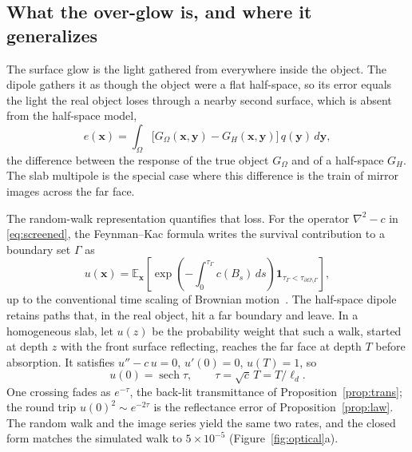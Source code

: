 \documentclass[11pt]{article}
\providecommand{\ROptSech}{0}
\renewcommand{\ROptSech}{5\times10^{-5}}
\newcommand{\ld}{\ell_d}
\newcommand{\E}{\mathbb{E}}
\begin{document}
\subsection{What the over-glow is, and where it generalizes}
\label{sec:optical}

The surface glow is the light gathered from everywhere inside the object. The
dipole gathers it as though the object were a flat half-space, so its error equals
the light the real object loses through a nearby second surface, which is absent from the
half-space model,
\begin{equation}
e(\mathbf{x})=\int_\Omega\big[G_\Omega(\mathbf{x},\mathbf{y})-G_H(\mathbf{x},\mathbf{y})\big]
\,q(\mathbf{y})\,d\mathbf{y},
\label{eq:greendiff}
\end{equation}
the difference between the response of the true object $G_\Omega$ and of a
half-space $G_H$. The slab multipole is the special case where this difference is
the train of mirror images across the far face.

The random-walk representation quantifies that loss. For the
operator $\nabla^2-c$ in \eqref{eq:screened}, the Feynman--Kac formula writes the
survival contribution to a boundary set $\Gamma$ as
\begin{equation}
u(\mathbf{x})=
\E_{\mathbf{x}}\!\left[
\exp\!\left(-\int_0^{\tau_\Gamma} c(B_s)\,ds\right)
\mathbf{1}_{\tau_\Gamma<\tau_{\partial\Omega\setminus\Gamma}}
\right],
\label{eq:fk}
\end{equation}
up to the conventional time scaling of Brownian motion~\cite{oksendal2003}. The
half-space dipole retains paths that, in the real object, hit a far boundary and
leave. In a homogeneous slab, let $u(z)$ be the probability weight that such a
walk, started at depth $z$ with the front surface reflecting, reaches the far face
at depth $T$ before absorption. It satisfies $u''-c\,u=0$, $u'(0)=0$, $u(T)=1$,
so
\begin{equation}
u(0)=\operatorname{sech}\tau,\qquad \tau=\sqrt{c}\,T=T/\ld .
\label{eq:sech}
\end{equation}
One crossing fades as $e^{-\tau}$, the back-lit transmittance of
Proposition~\ref{prop:trans}; the round trip $u(0)^2\sim e^{-2\tau}$ is the
reflectance error of Proposition~\ref{prop:law}. The random walk and the image series yield the same two rates, and the closed form matches the simulated walk to $\ROptSech$ (Figure~\ref{fig:optical}a).
\end{document}
